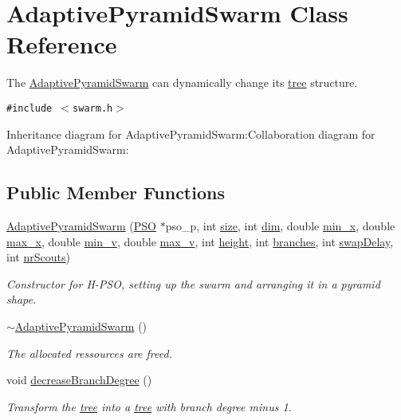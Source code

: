 \hypertarget{classAdaptivePyramidSwarm}{
\section{AdaptivePyramidSwarm Class Reference}
\label{classAdaptivePyramidSwarm}
}
The \hyperlink{classAdaptivePyramidSwarm}{AdaptivePyramidSwarm} can dynamically change its \hyperlink{classtree}{tree} structure.  


{\tt \#include $<$swarm.h$>$}

Inheritance diagram for AdaptivePyramidSwarm:Collaboration diagram for AdaptivePyramidSwarm:\subsection*{Public Member Functions}
\begin{CompactItemize}
\item 
\hyperlink{classAdaptivePyramidSwarm_859220f14a62847f77e03ef895b41673}{AdaptivePyramidSwarm} (\hyperlink{classPSO}{PSO} $\ast$pso\_\-p, int \hyperlink{runpso_8cpp_439227feff9d7f55384e8780cfc2eb82}{size}, int \hyperlink{runpso_8cpp_70b5e28b5bc3d1b63a7435c5fe50b837}{dim}, double \hyperlink{classSwarm_b504e23c39413573e3685a88435f5f85}{min\_\-x}, double \hyperlink{classSwarm_e5075d21be96c1cdf441bc2b612177c1}{max\_\-x}, double \hyperlink{classSwarm_160c79397ea811636e17c0e4d6297729}{min\_\-v}, double \hyperlink{classSwarm_2b0dbde2c275f991580a07a745cb5ade}{max\_\-v}, int \hyperlink{classPyramidSwarm_147496f1f506ee3f2e82cadc9c235baf}{height}, int \hyperlink{classPyramidSwarm_b60c66cd8c7437c9b9abb2016a65e824}{branches}, int \hyperlink{classPyramidSwarm_b45f85f201faea37d41695fe4d3cae04}{swapDelay}, int \hyperlink{classSwarm_6ec8b4463d83af484788490c203ae166}{nrScouts})
\begin{CompactList}\small\item\em Constructor for H-PSO, setting up the swarm and arranging it in a pyramid shape. \item\end{CompactList}\item 
\hyperlink{classAdaptivePyramidSwarm_2369e91955310eb199d661b1a2fb3905}{$\sim$AdaptivePyramidSwarm} ()
\begin{CompactList}\small\item\em The allocated ressources are freed. \item\end{CompactList}\item 
void \hyperlink{classAdaptivePyramidSwarm_1882a87c019b03a0e39cde841f598aaf}{decreaseBranchDegree} ()
\begin{CompactList}\small\item\em Transform the \hyperlink{classtree}{tree} into a \hyperlink{classtree}{tree} with branch degree minus 1. \item\end{CompactList}\end{CompactItemize}
